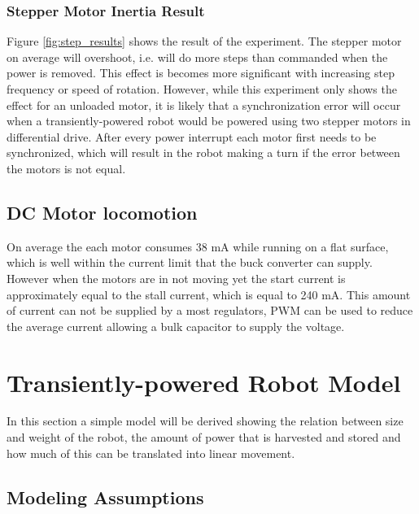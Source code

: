 \subsubsection{Stepper Motor Inertia Result}

Figure \ref{fig:step_results} shows the result of the experiment.
The stepper motor on average will overshoot, i.e. will do more steps than commanded when the power is removed.
This effect is becomes more significant with increasing step frequency or speed of rotation.
However, while this experiment only shows the effect for an unloaded motor, it is likely that a synchronization error will occur when a transiently-powered robot would be powered using two stepper motors in differential drive.
After every power interrupt each motor first needs to be synchronized, which will result in the robot making a turn if the error between the motors is not equal.


\subsection{DC Motor locomotion}




On average the each motor consumes 38 mA while running on a flat surface, which is well within the current limit that the buck converter can supply.
However when the motors are in not moving yet the start current is approximately equal to the stall current, which is equal to 240 mA.
This amount of current can not be supplied by a most regulators, PWM can be used to reduce the average current allowing a bulk capacitor to supply the voltage.


\section{Transiently-powered Robot Model}
\label{sec:transient_model}

In this section a simple model will be derived showing the relation between size and weight of the robot, the amount of power that is harvested and stored and how much of this can be translated into linear movement.

\subsection{Modeling Assumptions}

